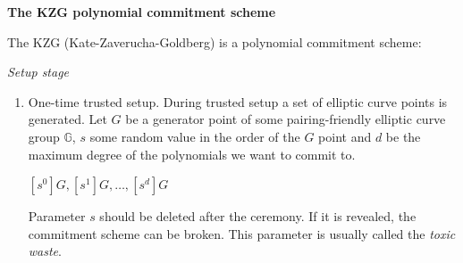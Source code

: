 \documentclass[../lecture-notes.tex]{subfiles}
\begin{document}
\textbf{The KZG polynomial commitment scheme}

\vspace{0.5 cm}


The KZG (Kate-Zaverucha-Goldberg) is a polynomial commitment scheme:

\textit{Setup stage}

\begin{enumerate}
    \item One-time trusted setup. During trusted setup a set of elliptic curve points is generated. Let $G$ be a generator point of some pairing-friendly
    elliptic curve group $\mathbb{G}$, $s$ some random value in the order of the $G$ point and $d$ be the maximum degree of the polynomials we want to commit to.

    \begin{center}
        $[s^0]G, [s^1]G, \ldots, [s^d]G$
    \end{center}

    Parameter $s$ should be deleted after the ceremony. If it is revealed, the commitment scheme can be broken. This parameter is usually called the \textit{toxic waste}.

\end{enumerate}
\end{document}
